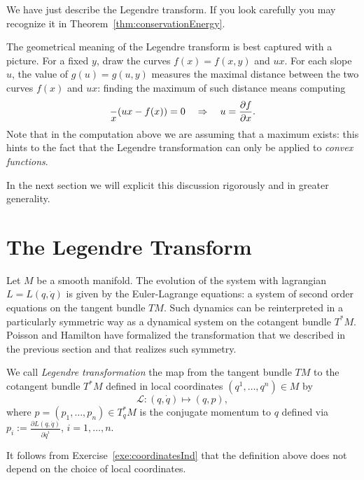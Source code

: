 \documentclass[english,fontsize=11pt,paper=a5,oneside]{scrbook}
\newcommand{\cL}{\mathcal{L}}
\let\d\relax
\newcommand{\d}{\mathrm{d}}
\theoremstyle{definition}
\begin{document}
We have just describe the Legendre transform.
If you look carefully you may recognize it in Theorem~\ref{thm:conservationEnergy}.

The geometrical meaning of the Legendre transform is best captured with a picture.
For a fixed $y$, draw the curves $f(x) = f(x,y)$ and $ux$.
For each slope $u$, the value of $g(u) = g(u,y)$ measures the maximal distance between the two curves $f(x)$ and $ux$: finding the maximum of such distance means
computing
\begin{equation}
  \frac{\d}{\d x}(ux - f(x)) = 0 \quad\Rightarrow\quad u = \frac{\partial f}{\partial x}.
\end{equation}
Note that in the computation above we are assuming that a maximum exists:
this hints to the fact that the Legendre transformation can only be applied to \emph{convex functions}.

In the next section we will explicit this discussion rigorously and in greater generality.

\section{The Legendre Transform}

Let $M$ be a smooth manifold.
The evolution of the system with lagrangian $L=L(q,\dot q)$ is given by the Euler-Lagrange equations: a system of second order equations on the tangent bundle $TM$.
Such dynamics can be reinterpreted in a particularly symmetric way as a dynamical system on the cotangent bundle $T^*M$.
Poisson and Hamilton have formalized the transformation that we described in the previous section and that realizes such symmetry.

\begin{tcolorbox}
  We call \emph{Legendre transformation} the map from the tangent bundle $TM$ to the cotangent bundle $T^*M$ defined in local coordinates $(q^1, \ldots, q^n)\in M$ by
  \begin{equation}\label{eq:legrendreTrafo}
    \cL: (q,\dot q) \mapsto (q,p),
  \end{equation}
  where $p = (p_1, \ldots, p_n) \in T^*_q M$ is the conjugate momentum to $q$ defined via $p_i := \frac{\partial L(q,\dot q)}{\partial \dot q^i}$, $i=1,\ldots,n$.
\end{tcolorbox}
It follows from Exercise~\ref{exe:coordinatesInd} that the definition above does not depend on the choice of local coordinates.

\end{document}
